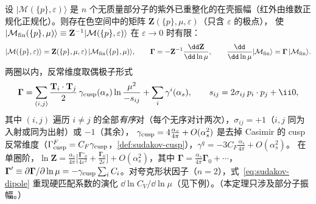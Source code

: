 \begin{theorem}\label{thm:sudakov-ir-poles}
设 $|\mathcal M(\{p\},\varepsilon)\rangle$ 是 $n$ 个无质量部分子的紫外已重整化的在壳振幅（红外由维数正规化正规化）。则存在色空间中的矩阵 $\mathbf Z(\{p\},\mu,\varepsilon)$（只含 $\varepsilon$ 的极点），
使 $|\mathcal M_{\rm fin}(\{p\},\mu)\rangle\equiv\mathbf Z^{-1}|\mathcal M(\{p\},\varepsilon)\rangle$ 在 $\varepsilon\to0$ 时有限：
\begin{equation}\label{eq:sudakov-Zfact}
|\mathcal M(\{p\},\varepsilon)\rangle=\mathbf Z(\{p\},\mu,\varepsilon)\,|\mathcal M_{\rm fin}(\{p\},\mu)\rangle,\qquad
\boldsymbol\Gamma=-\mathbf Z^{-1}\frac{\dd\mathbf Z}{\dd\ln\mu},\qquad \frac{\dd}{\dd\ln\mu}|\mathcal M_{\rm fin}\rangle=\boldsymbol\Gamma\,|\mathcal M_{\rm fin}\rangle .
\end{equation}
两圈以内，反常维度取偶极子形式
\begin{equation}\label{eq:sudakov-dipole}
\boldsymbol\Gamma=\sum_{(i,j)}\frac{\mathbf T_i\cdot\mathbf T_j}{2}\,\gamma_{\rm cusp}(\alpha_s)\ln\frac{\mu^2}{-s_{ij}}+\sum_i\gamma^i(\alpha_s),\qquad s_{ij}=2\sigma_{ij}\,p_i\cdot p_j+\ii0,
\end{equation}
其中 $(i,j)$ 遍历 $i\ne j$ 的全部\emph{有序}对（每个无序对计两次），$\sigma_{ij}=+1$（$i,j$ 同为入射或同为出射）或 $-1$（其余），
$\gamma_{\rm cusp}=4\frac{\alpha_s}{4\pi}+O(\alpha_s^2)$ 是去掉 Casimir 的 cusp 反常维度（$\Gamma^F_{\rm cusp}=C_F\gamma_{\rm cusp}$，\cref{def:sudakov-cusp}），$\gamma^q=-3C_F\frac{\alpha_s}{4\pi}+O(\alpha_s^2)$。
在单圈阶，$\ln\mathbf Z=\frac{\alpha_s}{4\pi}\big[\frac{\boldsymbol\Gamma'_0}{4\varepsilon^2}+\frac{\boldsymbol\Gamma_0}{2\varepsilon}\big]+O(\alpha_s^2)$，其中 $\boldsymbol\Gamma=\frac{\alpha_s}{4\pi}\boldsymbol\Gamma_0+\cdots$，
$\boldsymbol\Gamma'\equiv\partial\boldsymbol\Gamma/\partial\ln\mu=-\gamma_{\rm cusp}\sum_iC_i$。对夸克形状因子（$n=2$），式~\eqref{eq:sudakov-dipole} 重现硬匹配系数的演化 $\dd\ln C_V/\dd\ln\mu$（见下例）。（本定理只涉及部分子振幅。）
\end{theorem}

